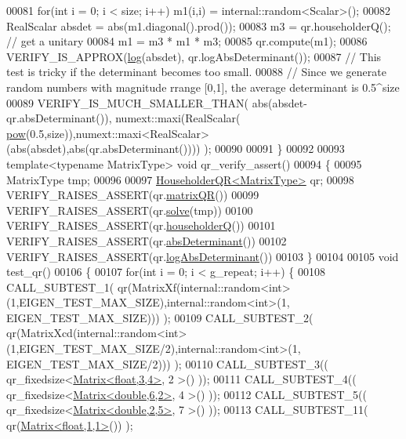 \begin{DoxyCode}
00081   \textcolor{keywordflow}{for}(\textcolor{keywordtype}{int} i = 0; i < size; i++) m1(i,i) = internal::random<Scalar>();
00082   RealScalar absdet = abs(m1.diagonal().prod());
00083   m3 = qr.householderQ(); \textcolor{comment}{// get a unitary}
00084   m1 = m3 * m1 * m3;
00085   qr.compute(m1);
00086   VERIFY\_IS\_APPROX(\hyperlink{structlog}{log}(absdet), qr.logAbsDeterminant());
00087   \textcolor{comment}{// This test is tricky if the determinant becomes too small.}
00088   \textcolor{comment}{// Since we generate random numbers with magnitude rrange [0,1], the average determinant is 0.5^size}
00089   VERIFY\_IS\_MUCH\_SMALLER\_THAN( abs(absdet-qr.absDeterminant()), numext::maxi(RealScalar(
      \hyperlink{group___core___module_ab6dc101d82e8228a19a8840e3a29c1c9}{pow}(0.5,size)),numext::maxi<RealScalar>(abs(absdet),abs(qr.absDeterminant()))) );
00090   
00091 \}
00092 
00093 \textcolor{keyword}{template}<\textcolor{keyword}{typename} MatrixType> \textcolor{keywordtype}{void} qr\_verify\_assert()
00094 \{
00095   MatrixType tmp;
00096 
00097   \hyperlink{group___q_r___module}{HouseholderQR<MatrixType>} qr;
00098   VERIFY\_RAISES\_ASSERT(qr.\hyperlink{group___q_r___module_ae837f2fb30099212c53b3042c7d699c9}{matrixQR}())
00099   VERIFY\_RAISES\_ASSERT(qr.\hyperlink{group___q_r___module_a3e8e56769bbaaed0616ad98c4ff99c7b}{solve}(tmp))
00100   VERIFY\_RAISES\_ASSERT(qr.\hyperlink{group___q_r___module_affd506c10ef2d25f56e7b1f9f25ff885}{householderQ}())
00101   VERIFY\_RAISES\_ASSERT(qr.\hyperlink{group___q_r___module_aaf4ef26c0b7affc91431ec59c92d64c3}{absDeterminant}())
00102   VERIFY\_RAISES\_ASSERT(qr.\hyperlink{group___q_r___module_af61b6dbef34fc51c825182b16dc43ca1}{logAbsDeterminant}())
00103 \}
00104 
00105 \textcolor{keywordtype}{void} test\_qr()
00106 \{
00107   \textcolor{keywordflow}{for}(\textcolor{keywordtype}{int} i = 0; i < g\_repeat; i++) \{
00108    CALL\_SUBTEST\_1( qr(MatrixXf(internal::random<int>(1,EIGEN\_TEST\_MAX\_SIZE),internal::random<int>(1,
      EIGEN\_TEST\_MAX\_SIZE))) );
00109    CALL\_SUBTEST\_2( qr(MatrixXcd(internal::random<int>(1,EIGEN\_TEST\_MAX\_SIZE/2),internal::random<int>(1,
      EIGEN\_TEST\_MAX\_SIZE/2))) );
00110    CALL\_SUBTEST\_3(( qr\_fixedsize<\hyperlink{group___core___module_class_eigen_1_1_matrix}{Matrix<float,3,4>}, 2 >() ));
00111    CALL\_SUBTEST\_4(( qr\_fixedsize<\hyperlink{group___core___module_class_eigen_1_1_matrix}{Matrix<double,6,2>}, 4 >() ));
00112    CALL\_SUBTEST\_5(( qr\_fixedsize<\hyperlink{group___core___module_class_eigen_1_1_matrix}{Matrix<double,2,5>}, 7 >() ));
00113    CALL\_SUBTEST\_11( qr(\hyperlink{group___core___module_class_eigen_1_1_matrix}{Matrix<float,1,1>}()) );

\end{DoxyCode}
